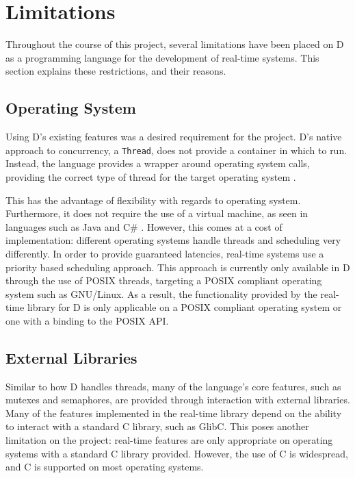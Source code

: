 \section{Limitations} %
Throughout the course of this project, several limitations have been placed on 
D as a programming language for the development of real-time systems. 
This section explains these restrictions, and their reasons.
\subsection{Operating System}
Using D's existing features was a desired requirement for the project. 
D's native approach to concurrency, a \texttt{Thread}, does not provide a
container in which to run. 
Instead, the language provides a wrapper around operating system calls, 
providing the correct type of thread for the target operating system
\cite{github-core-thread}. 
\par\bigskip\noindent
This has the advantage of flexibility with regards to operating system.
Furthermore, it does not require the use of a virtual machine, as seen in languages such as 
Java and C\# \cite{zhang2007exploiting}. However, this comes at a cost of implementation: 
different operating systems handle threads and scheduling very differently. 
In order to provide guaranteed latencies, real-time systems use a priority based 
scheduling approach. This approach is currently only available in D through the use of 
POSIX threads, targeting a POSIX compliant operating system such as GNU/Linux. 
As a result, the functionality provided by the real-time library for D is only 
applicable on a POSIX compliant operating system or one with a binding to the POSIX 
API.

\subsection{External Libraries}

Similar to how D handles threads, many of the language's core features, such as 
mutexes and semaphores, are provided through interaction with external libraries. 
Many of the features implemented in the real-time library depend on the ability 
to interact with a standard C library, such as GlibC. This poses another limitation 
on the project: real-time features are only appropriate on operating systems with 
a standard C library provided. However, the use of C is widespread, and C is 
supported on most operating systems. 

